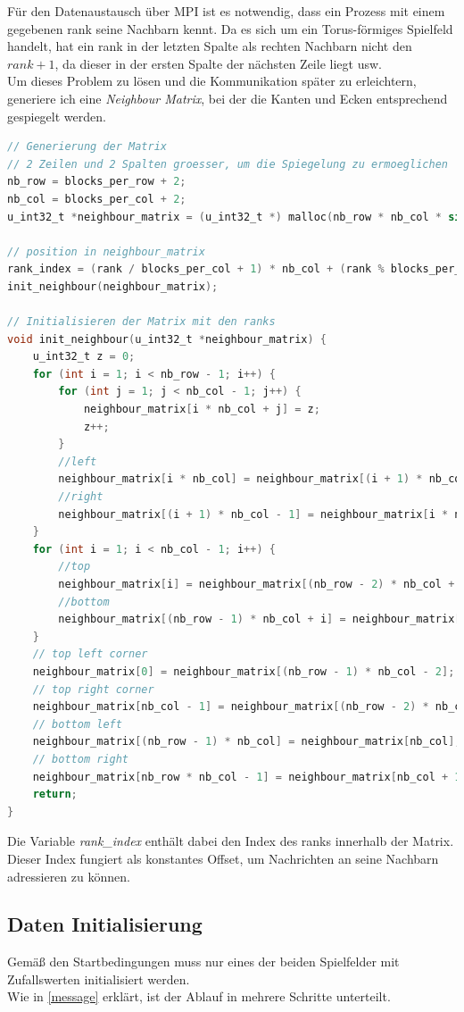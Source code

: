 \documentclass[german,plainarticle,hyperref,utf8]{zihpub}
\begin{document}
	Für den Datenaustausch über MPI ist es notwendig, dass ein Prozess mit einem gegebenen rank seine Nachbarn kennt. Da es sich um ein Torus-förmiges Spielfeld handelt, hat ein rank in der letzten Spalte als rechten Nachbarn nicht den $rank + 1$, da dieser in der ersten Spalte der nächsten Zeile liegt usw.\\
	Um dieses Problem zu lösen und die Kommunikation später zu erleichtern, generiere ich eine \textit{Neighbour Matrix}, bei der die Kanten und Ecken entsprechend gespiegelt werden.
	\begin{lstlisting}[language=C, caption=Generierung der Neighbour Matrix]
// Generierung der Matrix
// 2 Zeilen und 2 Spalten groesser, um die Spiegelung zu ermoeglichen
nb_row = blocks_per_row + 2;
nb_col = blocks_per_col + 2;
u_int32_t *neighbour_matrix = (u_int32_t *) malloc(nb_row * nb_col * sizeof(u_int32_t));

// position in neighbour_matrix
rank_index = (rank / blocks_per_col + 1) * nb_col + (rank % blocks_per_col + 1);
init_neighbour(neighbour_matrix);

// Initialisieren der Matrix mit den ranks
void init_neighbour(u_int32_t *neighbour_matrix) {
	u_int32_t z = 0;
	for (int i = 1; i < nb_row - 1; i++) {
		for (int j = 1; j < nb_col - 1; j++) {
			neighbour_matrix[i * nb_col + j] = z;
			z++;
		}
		//left
		neighbour_matrix[i * nb_col] = neighbour_matrix[(i + 1) * nb_col - 2];
		//right
		neighbour_matrix[(i + 1) * nb_col - 1] = neighbour_matrix[i * nb_col + 1];
	}
	for (int i = 1; i < nb_col - 1; i++) {
		//top
		neighbour_matrix[i] = neighbour_matrix[(nb_row - 2) * nb_col + i];
		//bottom
		neighbour_matrix[(nb_row - 1) * nb_col + i] = neighbour_matrix[nb_col + i];
	}
	// top left corner
	neighbour_matrix[0] = neighbour_matrix[(nb_row - 1) * nb_col - 2];
	// top right corner
	neighbour_matrix[nb_col - 1] = neighbour_matrix[(nb_row - 2) * nb_col + 1];
	// bottom left
	neighbour_matrix[(nb_row - 1) * nb_col] = neighbour_matrix[nb_col];
	// bottom right
	neighbour_matrix[nb_row * nb_col - 1] = neighbour_matrix[nb_col + 1];
	return;
}\end{lstlisting}

	Die Variable \textit{rank\_index} enthält dabei den Index des ranks innerhalb der Matrix. Dieser Index fungiert als konstantes Offset, um Nachrichten an seine Nachbarn adressieren zu können.


	\subsection{Daten Initialisierung} \label{data_init}
	Gemäß den Startbedingungen muss nur eines der beiden Spielfelder mit Zufallswerten initialisiert werden.\\
	Wie in \ref{message} erklärt, ist der Ablauf in mehrere Schritte unterteilt.
	
\end{document}

